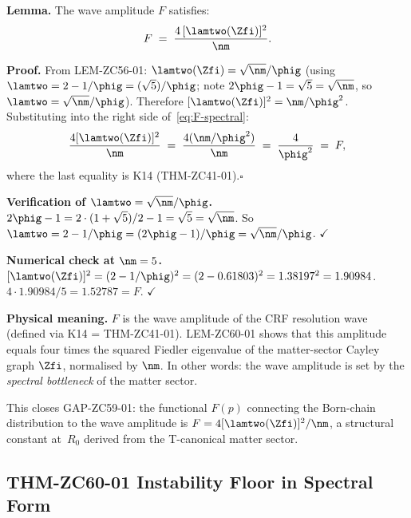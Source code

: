 \documentclass[12pt, a4paper]{article}
\begin{document}
\begin{formalbox}[title={LEM-ZC60-01: $F = 4[\lamtwo(\Zfi)]^2/\nm$
  --- Wave Amplitude from Matter-Sector Fiedler ($R_0$, Exact)}]
\textbf{Lemma.}
The wave amplitude $F$ satisfies:
\begin{equation}\label{eq:F-spectral}
  F \;=\; \frac{4\,[\lamtwo(\Zfi)]^2}{\nm}.
\end{equation}

\textbf{Proof.}
From LEM-ZC56-01: $\lamtwo(\Zfi) = \sqrt{\nm}/\phig$
(using $\lamtwo = 2-1/\phig = (\sqrt{5})/\phig$; note
$2\phig-1=\sqrt{5}=\sqrt{\nm}$, so $\lamtwo=\sqrt{\nm}/\phig$).
Therefore $[\lamtwo(\Zfi)]^2 = \nm/\phig^2$.
Substituting into the right side of~\eqref{eq:F-spectral}:
\begin{equation*}
  \frac{4[\lamtwo(\Zfi)]^2}{\nm}
  \;=\; \frac{4(\nm/\phig^2)}{\nm}
  \;=\; \frac{4}{\phig^2}
  \;=\; F,
\end{equation*}
where the last equality is K14 (THM-ZC41-01).\hfill$\square$

\textbf{Verification of $\lamtwo=\sqrt{\nm}/\phig$.}
$2\phig-1 = 2\cdot(1+\sqrt{5})/2 - 1 = \sqrt{5} = \sqrt{\nm}$.
So $\lamtwo = 2-1/\phig = (2\phig-1)/\phig = \sqrt{\nm}/\phig$.
$\checkmark$

\textbf{Numerical check at $\nm=5$.}
$[\lamtwo(\Zfi)]^2 = (2-1/\phig)^2 = (2-0.61803)^2
= 1.38197^2 = 1.90984$.
$4\cdot1.90984/5 = 1.52787 = F$. $\checkmark$

\textbf{Physical meaning.}
$F$ is the wave amplitude of the CRF resolution wave
(defined via K14 = THM-ZC41-01).  LEM-ZC60-01 shows that
this amplitude equals four times the squared Fiedler
eigenvalue of the matter-sector Cayley graph $\Zfi$,
normalised by $\nm$.  In other words: the wave amplitude
is set by the \emph{spectral bottleneck} of the matter sector.

This closes GAP-ZC59-01: the functional $F(p)$ connecting
the Born-chain distribution to the wave amplitude is
$F = 4[\lamtwo(\Zfi)]^2/\nm$, a structural constant
at~$R_0$ derived from the T-canonical matter sector.
\end{formalbox}

\subsection{THM-ZC60-01 \quad Instability Floor in Spectral Form}
\label{sec:thm01}
\end{document}
